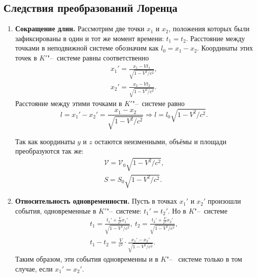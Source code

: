 \subsection{Следствия преобразований Лоренца}
\begin{enumerate}
    \item {\bf Сокращение длин.}
        Рассмотрим две точки $x_1$ и $x_2$, положения которых были зафиксированы в один и тот же момент времени: $t_1 = t_2$. Расстояние между точками в неподвижной системе обозначим как $l_0 = x_1 - x_2$. Координаты этих точек в $K'$"--~системе равны соответственно
        \begin{gather*}
            x_1' = \frac{x_1 - V t_1}{\sqrt{1 - V^2 \big/c^2 }}, \\
            x_2' = \frac{x_2 - V t_2}{\sqrt{1 - V^2 \big/c^2 }}.
        \end{gather*} 
        Расстояние между этими точками в $K'$"--~системе равно
        \[
            l = x_1' - x_2' = \frac{x_1 - x_2}{\sqrt{1 - V^2 \big/ c^2}} \Rightarrow l = l_0 \sqrt{1 - V^2 \big/ c^2}.
        \]
        \begin{note}
            Так как координаты $y$ и $z$ остаются неизменными, объёмы и площади преобразуются так же:
            \[ \begin{aligned}
                \mathcal{V} = \mathcal{V}_0 \sqrt{1 - V^2 \big/ c^2}, \\
                S = S_0 \sqrt{1 - V^2 \big/ c^2}.
            \end{aligned} \]
        \end{note}

    \item {\bf Относительность одновременности.} Пусть в точках $x_1'$ и $x_2'$ произошли события, одновременные в $K'$"--~системе: $t_1' = t_2'$. Но в $K$"--~системе
        \begin{gather*}
            t_1 = \frac{t_1' + \frac{V}{c^2} x_1'}{\sqrt{1 - V^2 \big/ c^2}}, \
            t_2 = \frac{t_2' + \frac{V}{c^2} x_2'}{\sqrt{1 - V^2 \big/ c^2}}, \\
            t_1 - t_2 = \frac{V}{c^2} \cdot \frac{x_1' - x_2'}{\sqrt{1 - V^2 \big/ c^2}}. 
        \end{gather*}
        Таким образом, эти события одновременны и в $K$"--~ системе только в том случае, если $x_1' = x_2'$.


\end{enumerate}
